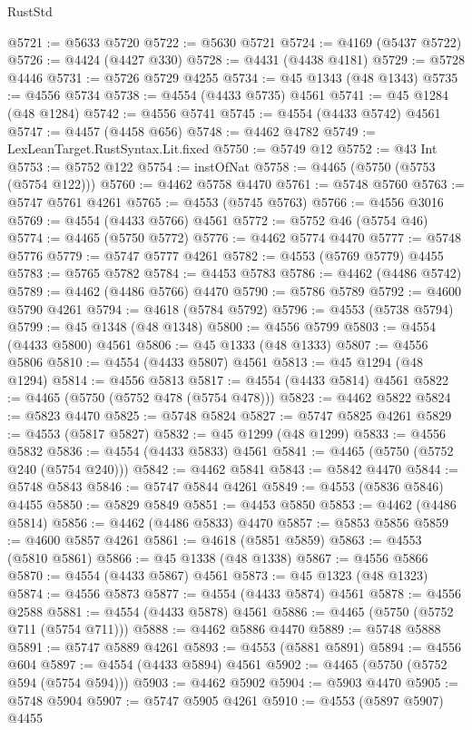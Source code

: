 \begin{lexlean}{RustStd}
\begin{coremodule}
@5721 := @5633 @5720
@5722 := @5630 @5721
@5724 := @4169 (@5437 @5722)
@5726 := @4424 (@4427 @330)
@5728 := @4431 (@4438 @4181)
@5729 := @5728 @4446
@5731 := @5726 @5729 @4255
@5734 := @45 @1343 (@48 @1343)
@5735 := @4556 @5734
@5738 := @4554 (@4433 @5735) @4561
@5741 := @45 @1284 (@48 @1284)
@5742 := @4556 @5741
@5745 := @4554 (@4433 @5742) @4561
@5747 := @4457 (@4458 @656)
@5748 := @4462 @4782
@5749 := LexLeanTarget.RustSyntax.Lit.fixed
@5750 := @5749 @12
@5752 := @43 Int
@5753 := @5752 @122
@5754 := instOfNat
@5758 := @4465 (@5750 (@5753 (@5754 @122)))
@5760 := @4462 @5758 @4470
@5761 := @5748 @5760
@5763 := @5747 @5761 @4261
@5765 := @4553 (@5745 @5763)
@5766 := @4556 @3016
@5769 := @4554 (@4433 @5766) @4561
@5772 := @5752 @46 (@5754 @46)
@5774 := @4465 (@5750 @5772)
@5776 := @4462 @5774 @4470
@5777 := @5748 @5776
@5779 := @5747 @5777 @4261
@5782 := @4553 (@5769 @5779) @4455
@5783 := @5765 @5782
@5784 := @4453 @5783
@5786 := @4462 (@4486 @5742)
@5789 := @4462 (@4486 @5766) @4470
@5790 := @5786 @5789
@5792 := @4600 @5790 @4261
@5794 := @4618 (@5784 @5792)
@5796 := @4553 (@5738 @5794)
@5799 := @45 @1348 (@48 @1348)
@5800 := @4556 @5799
@5803 := @4554 (@4433 @5800) @4561
@5806 := @45 @1333 (@48 @1333)
@5807 := @4556 @5806
@5810 := @4554 (@4433 @5807) @4561
@5813 := @45 @1294 (@48 @1294)
@5814 := @4556 @5813
@5817 := @4554 (@4433 @5814) @4561
@5822 := @4465 (@5750 (@5752 @478 (@5754 @478)))
@5823 := @4462 @5822
@5824 := @5823 @4470
@5825 := @5748 @5824
@5827 := @5747 @5825 @4261
@5829 := @4553 (@5817 @5827)
@5832 := @45 @1299 (@48 @1299)
@5833 := @4556 @5832
@5836 := @4554 (@4433 @5833) @4561
@5841 := @4465 (@5750 (@5752 @240 (@5754 @240)))
@5842 := @4462 @5841
@5843 := @5842 @4470
@5844 := @5748 @5843
@5846 := @5747 @5844 @4261
@5849 := @4553 (@5836 @5846) @4455
@5850 := @5829 @5849
@5851 := @4453 @5850
@5853 := @4462 (@4486 @5814)
@5856 := @4462 (@4486 @5833) @4470
@5857 := @5853 @5856
@5859 := @4600 @5857 @4261
@5861 := @4618 (@5851 @5859)
@5863 := @4553 (@5810 @5861)
@5866 := @45 @1338 (@48 @1338)
@5867 := @4556 @5866
@5870 := @4554 (@4433 @5867) @4561
@5873 := @45 @1323 (@48 @1323)
@5874 := @4556 @5873
@5877 := @4554 (@4433 @5874) @4561
@5878 := @4556 @2588
@5881 := @4554 (@4433 @5878) @4561
@5886 := @4465 (@5750 (@5752 @711 (@5754 @711)))
@5888 := @4462 @5886 @4470
@5889 := @5748 @5888
@5891 := @5747 @5889 @4261
@5893 := @4553 (@5881 @5891)
@5894 := @4556 @604
@5897 := @4554 (@4433 @5894) @4561
@5902 := @4465 (@5750 (@5752 @594 (@5754 @594)))
@5903 := @4462 @5902
@5904 := @5903 @4470
@5905 := @5748 @5904
@5907 := @5747 @5905 @4261
@5910 := @4553 (@5897 @5907) @4455

\end{coremodule}
\end{lexlean}

